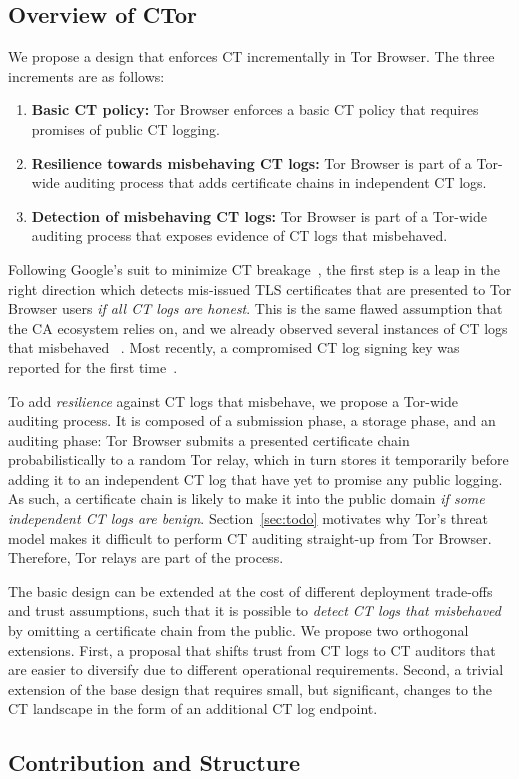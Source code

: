 \subsection{Overview of CTor}
We propose a design that enforces CT incrementally in Tor Browser.  The three
increments are as follows:
\begin{enumerate}
	\item \textbf{Basic CT policy:}
		Tor Browser enforces a basic CT policy that requires promises of public
		CT logging.
	\item \textbf{Resilience towards misbehaving CT logs:}
		Tor Browser is part of a Tor-wide auditing process that adds certificate
		chains in independent CT logs.
	\item \textbf{Detection of misbehaving CT logs:}
		Tor Browser is part of a Tor-wide auditing process that exposes evidence
		of CT logs that misbehaved.
\end{enumerate}

Following Google's suit to minimize CT breakage~\cite{does-ct-break-the-web},
the first step is a leap in the right direction which detects mis-issued TLS
certificates that are presented to Tor Browser users \emph{if all CT logs are
honest}.  This is the same flawed assumption that the CA ecosystem relies on,
and we already observed several instances of CT logs that misbehaved~%
	\cite{izenpe-disqualified,venafi-disqualified}.
Most recently, a compromised CT log signing key was reported for the first
time~\cite{digicert-log-compromised}.

To add \emph{resilience} against CT logs that misbehave, we propose a Tor-wide
auditing process.  It is composed of a submission phase, a storage phase, and
an auditing phase:
	Tor Browser submits a presented certificate chain probabilistically to
		a random Tor relay,
	which in turn stores it temporarily before adding it to an independent CT
		log that have yet to promise any public logging.
As such, a certificate chain is likely to make it into the public domain
\emph{if some independent CT logs are benign}.  Section~\ref{sec:todo} motivates
why Tor's threat model makes it difficult to perform CT auditing straight-up
from Tor Browser.  Therefore, Tor relays are part of the process.

The basic design can be extended at the cost of different deployment trade-offs
and trust assumptions, such that it is possible to \emph{detect CT logs that
misbehaved} by omitting a certificate chain from the public.  We propose two
orthogonal extensions.  First, a proposal that shifts trust from CT logs to CT
auditors that are easier to diversify due to different operational
requirements.  Second, a trivial extension of the base design that requires
small, but significant, changes to the CT landscape in the form of an
additional CT log endpoint.

\subsection{Contribution and Structure}
